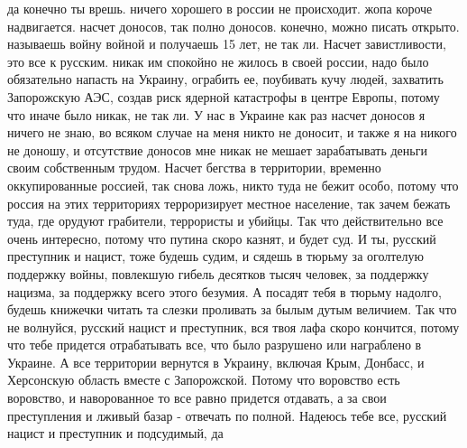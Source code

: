 да конечно ты врешь. ничего хорошего в россии не происходит. жопа короче
надвигается. насчет доносов, так полно доносов. конечно, можно писать открыто.
называешь войну войной и получаешь 15 лет, не так ли. Насчет завистливости, это
все к русским. никак им спокойно не жилось в своей россии, надо было
обязательно напасть на Украину, ограбить ее, поубивать кучу людей, захватить
Запорожскую АЭС, создав риск ядерной катастрофы в центре Европы, потому что
иначе было никак, не так ли. У нас в Украине как раз насчет доносов я ничего не
знаю, во всяком случае на меня никто не доносит, и также я на никого не доношу,
и отсутствие доносов мне никак не мешает зарабатывать деньги своим собственным
трудом. Насчет бегства в территории, временно оккупированные россией, так снова
ложь, никто туда не бежит особо, потому что россия на этих территориях
терроризирует местное население, так зачем бежать туда, где орудуют грабители,
террористы и убийцы. Так что действительно все очень интересно, потому что
путина скоро казнят, и будет суд. И ты, русский преступник и нацист, тоже
будешь судим, и сядешь в тюрьму за оголтелую поддержку войны, повлекшую гибель
десятков тысяч человек, за поддержку нацизма, за поддержку всего этого безумия.
А посадят тебя в тюрьму надолго, будешь книжечки читать та слезки проливать за
былым дутым величием. Так что не волнуйся, русский нацист и преступник, вся
твоя лафа скоро кончится, потому что тебе придется отрабатывать все, что было
разрушено или награблено в Украине. А все территории вернутся в Украину,
включая Крым, Донбасс, и Херсонскую область вместе с Запорожской. Потому что
воровство есть воровство, и наворованное то все равно придется отдавать, а за
свои преступления и лживый базар - отвечать по полной. Надеюсь тебе все,
русский нацист и преступник и подсудимый, да

